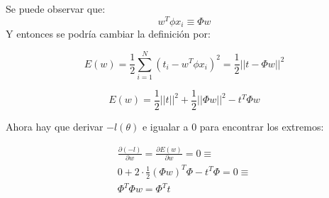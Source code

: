 \documentclass[a4paper,10pt]{article}
\begin{document}
Se puede observar que:
\begin{equation*}
w^T\phi x_i \equiv \Phi w
\end{equation*}
Y entonces se podría cambiar la definición por:

\begin{equation*}
E(w) = 
\frac{1}{2} \sum_{i = 1}^{N} (t_i - w^T\phi x_i)^2 =
\frac{1}{2}||t - \Phi w||^2
\end{equation*}

\begin{equation*}
E(w) = 
\frac{1}{2}||t||^2 + \frac{1}{2}||\Phi w||^2 - t^T\Phi w
\end{equation*}


Ahora hay que derivar $-l(\theta)$ e igualar a $0$ para encontrar los extremos:

\begin{align*}
\frac{\partial (-l)}{\partial w} = 
\frac{\partial E(w)}{\partial w} = 0 \equiv\\
% 
0 + 2\cdot \frac{1}{2}(\Phi w)^T\Phi - t^T\Phi = 0 \equiv \\
% 
\Phi^T\Phi w = \Phi^Tt
\end{align*}
\end{document}
